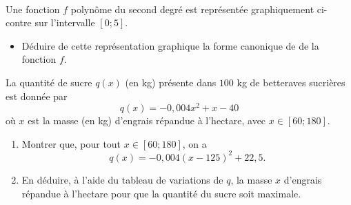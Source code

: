 \documentclass[11pt]{article}
\begin{document}
\begin{exo}~\\[-10mm]
  \begin{minipage}{.47\textwidth}
  Une fonction $f$ polynôme du second degré est représentée graphiquement
  ci-contre sur l'intervalle $[0; 5]$.
  \begin{itemize}
    \item Déduire de cette représentation graphique la forme canonique de de la
      fonction $f$.
  \end{itemize}
\end{minipage}
\begin{minipage}{.47\textwidth}
  \begin{center}
\end{center}
\end{minipage}
\end{exo}

\begin{exo}
  La quantité de sucre $q(x)$ (en kg) présente dans $100$ kg de betteraves
  sucrières est donnée par
  \[
    q(x) = -0,004x^2+x-40
  \]
  où $x$ est la masse (en kg) d'engrais répandue à l'hectare, avec $x\in[60;
  180]$.
  \begin{enumerate}
    \item Montrer que, pour tout $x\in[60; 180]$, on a
      \[
        q(x) = -0,004(x-125)^2+22,5.
      \]
    \item En déduire, à l'aide du tableau de variations de $q$, la masse $x$
      d'engrais répandue à l'hectare pour que la quantité du sucre soit
      maximale.
  \end{enumerate}
\end{exo}
\end{document}
